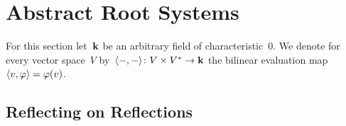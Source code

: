 \section{Abstract Root Systems}


\begin{convention}
  For this section let~$\mathbf{k}$ be an arbitrary field of characteristic~$0$.
  We denote for every vector space~$V$ by~$\langle-,-\rangle \colon V \times V^* \to \mathbf{k}$ the bilinear evaluation map~$\langle v, \varphi\rangle = \varphi(v)$.
\end{convention}





\subsection{Reflecting on Reflections}


